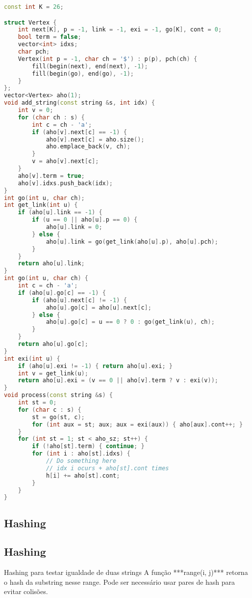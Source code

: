 \documentclass[11pt, a4paper, twoside]{article}
\begin{document}
\begin{lstlisting}[language=C++]
const int K = 26;

struct Vertex {
    int next[K], p = -1, link = -1, exi = -1, go[K], cont = 0;
    bool term = false;
    vector<int> idxs;
    char pch;
    Vertex(int p = -1, char ch = '$') : p(p), pch(ch) {
        fill(begin(next), end(next), -1);
        fill(begin(go), end(go), -1);
    }
};
vector<Vertex> aho(1);
void add_string(const string &s, int idx) {
    int v = 0;
    for (char ch : s) {
        int c = ch - 'a';
        if (aho[v].next[c] == -1) {
            aho[v].next[c] = aho.size();
            aho.emplace_back(v, ch);
        }
        v = aho[v].next[c];
    }
    aho[v].term = true;
    aho[v].idxs.push_back(idx);
}
int go(int u, char ch);
int get_link(int u) {
    if (aho[u].link == -1) {
        if (u == 0 || aho[u].p == 0) {
            aho[u].link = 0;
        } else {
            aho[u].link = go(get_link(aho[u].p), aho[u].pch);
        }
    }
    return aho[u].link;
}
int go(int u, char ch) {
    int c = ch - 'a';
    if (aho[u].go[c] == -1) {
        if (aho[u].next[c] != -1) {
            aho[u].go[c] = aho[u].next[c];
        } else {
            aho[u].go[c] = u == 0 ? 0 : go(get_link(u), ch);
        }
    }
    return aho[u].go[c];
}
int exi(int u) {
    if (aho[u].exi != -1) { return aho[u].exi; }
    int v = get_link(u);
    return aho[u].exi = (v == 0 || aho[v].term ? v : exi(v));
}
void process(const string &s) {
    int st = 0;
    for (char c : s) {
        st = go(st, c);
        for (int aux = st; aux; aux = exi(aux)) { aho[aux].cont++; }
    }
    for (int st = 1; st < aho_sz; st++) {
        if (!aho[st].term) { continue; }
        for (int i : aho[st].idxs) {
            // Do something here
            // idx i ocurs + aho[st].cont times
            h[i] += aho[st].cont;
        }
    }
}
\end{lstlisting}

\subsection{Hashing}

\subsection{Hashing}



Hashing para testar igualdade de duas strings   
A função ***range(i, j)*** retorna o hash da substring nesse range.   
Pode ser necessário usar pares de hash para evitar colisões.
\end{document}
